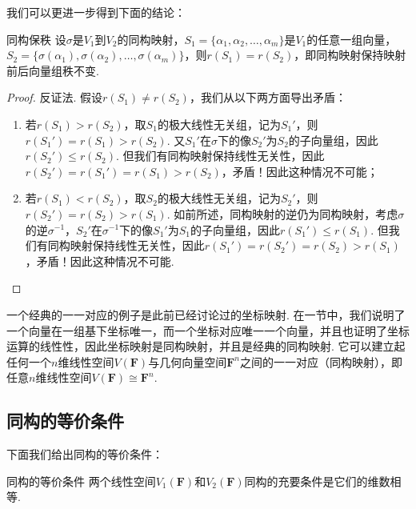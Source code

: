 \begin{enumerate}
          我们可以更进一步得到下面的结论：
          \begin{theorem}{}{同构保秩}
              设$\sigma$是$V_1$到$V_2$的同构映射，$S_1=\{\alpha_1,\alpha_2,\ldots,\alpha_m\}$是$V_1$的任意一组向量，$S_2=\{\sigma(\alpha_1),\sigma(\alpha_2),\ldots,\sigma(\alpha_m)\}$，则$r(S_1)=r(S_2)$，即同构映射保持映射前后向量组秩不变.
          \end{theorem}
          \begin{proof}
              反证法. 假设$r(S_1)\neq r(S_2)$，我们从以下两方面导出矛盾：
              \begin{enumerate}
                  \item 若$r(S_1)>r(S_2)$，取$S_1$的极大线性无关组，记为$S_1'$，则$r(S_1')=r(S_1)>r(S_2)$. 又$S_1'$在$\sigma$下的像$S_2'$为$S_2$的子向量组，因此$r(S_2')\leqslant r(S_2)$. 但我们有同构映射保持线性无关性，因此$r(S_2')=r(S_1')=r(S_1)>r(S_2)$，矛盾！因此这种情况不可能；

                  \item 若$r(S_1)<r(S_2)$，取$S_2$的极大线性无关组，记为$S_2'$，则$r(S_2')=r(S_2)>r(S_1)$. 如前所述，同构映射的逆仍为同构映射，考虑$\sigma$的逆$\sigma^{-1}$，$S_2'$在$\sigma^{-1}$下的像$S_1'$为$S_1$的子向量组，因此$r(S_1')\leqslant r(S_1)$. 但我们有同构映射保持线性无关性，因此$r(S_1')=r(S_2')=r(S_2)>r(S_1)$，矛盾！因此这种情况不可能.
              \end{enumerate}
          \end{proof}
\end{enumerate}

一个经典的一一对应的例子是此前已经讨论过的坐标映射. 在一节中，我们说明了一个向量在一组基下坐标唯一，而一个坐标对应唯一一个向量，并且也证明了坐标运算的线性性，因此坐标映射是同构映射，并且是经典的同构映射. 它可以建立起任何一个$n$维线性空间$V(\mathbf{F})$与几何向量空间$\mathbf{F}^n$之间的一一对应（同构映射），即任意$n$维线性空间$V(\mathbf{F})\cong\mathbf{F}^n$.

\subsection{同构的等价条件}

下面我们给出同构的等价条件：
\begin{theorem}{}{同构的等价条件}
    两个线性空间$V_1(\mathbf{F})$和$V_2(\mathbf{F})$同构的充要条件是它们的维数相等.
\end{theorem}

